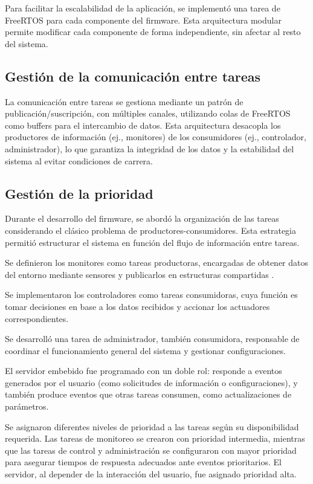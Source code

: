 Para facilitar la escalabilidad de la aplicación, se implementó una tarea de FreeRTOS para cada componente del firmware. Esta arquitectura modular permite modificar cada componente de forma independiente, sin afectar al resto del sistema.

\subsection{Gestión de la comunicación entre tareas}
La comunicación entre tareas se gestiona mediante un patrón de publicación/suscripción, con múltiples canales, utilizando colas de FreeRTOS como buffers para el intercambio de datos. Esta arquitectura desacopla los productores de información (ej., monitores) de los consumidores (ej., controlador, administrador), lo que garantiza la integridad de los datos y la estabilidad del sistema al evitar condiciones de carrera.

\subsection{Gestión de la prioridad}
Durante el desarrollo del firmware, se abordó la organización de las tareas considerando el clásico problema de productores-consumidores. Esta estrategia permitió estructurar el sistema en función del flujo de información entre tareas.

Se definieron los monitores como tareas productoras, encargadas de obtener datos del entorno mediante sensores y publicarlos en estructuras compartidas .

Se implementaron los controladores como tareas consumidoras, cuya función es tomar decisiones en base a los datos recibidos y accionar los actuadores correspondientes.

Se desarrolló una tarea de administrador, también consumidora, responsable de coordinar el funcionamiento general del sistema y gestionar configuraciones.

El servidor embebido fue programado con un doble rol: responde a eventos generados por el usuario (como solicitudes de información o configuraciones), y también produce eventos que otras tareas consumen, como actualizaciones de parámetros.

Se asignaron diferentes niveles de prioridad a las tareas según su disponibilidad requerida. Las tareas de monitoreo se crearon con prioridad intermedia, mientras que las tareas de control y administración se configuraron con mayor prioridad para asegurar tiempos de respuesta adecuados ante eventos prioritarios. El servidor, al depender de la interacción del usuario, fue asignado prioridad alta.

